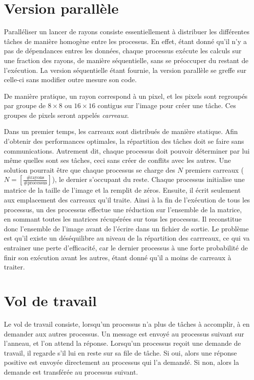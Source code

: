 \documentclass[a4paper,11pt]{article}
\begin{document}
\section{Version parallèle}

Paralléliser un lancer de rayons consiste essentiellement à distribuer les différentes tâches de manière homogène entre les processus. En effet, étant donné qu'il n'y  a pas de dépendances entres les données, chaque processus exécute les calculs sur une fraction des rayons, de manière séquentielle, sans se préoccuper du restant de l'exécution. La version séquentielle étant fournie, la version parallèle se greffe sur celle-ci sans modifier outre mesure son code.

De manière pratique, un rayon correspond à un pixel, et les pixels sont regroupés par groupe de $8 \times 8$ ou $16 \times 16$ contigus sur l'image pour créer une tâche. Ces groupes de pixels seront appelés \emph{carreaux}. 

Dans un premier temps, les carreaux sont distribués de manière statique. Afin d'obtenir des performances optimales, la répartition des tâches doit se faire sans communications. Autrement dit, chaque processus doit pouvoir déterminer par lui même quelles sont ses tâches, ceci sans créer de conflits avec les autres. Une solution pourrait être que chaque processus se charge des $N$ premiers carreaux ($N = \left[\frac{\#\mathrm{rayons}}{\#\mathrm{processus}}\right]$), le dernier s'occupant du reste. Chaque processus initialise une matrice de la taille de l'image et la remplit de zéros. Ensuite, il écrit seulement aux emplacement des carreaux qu'il traite. Ainsi à la fin de l'exécution de tous les processus, un des processus effectue une réduction sur l'ensemble de la matrice, en sommant toutes les matrices récupérées sur tous les processus. Il reconstitue donc l'ensemble de l'image avant de l'écrire dans un fichier de sortie.
Le problème est qu'il existe un déséquilibre au niveau de la répartition des carrreaux, ce qui va entrainer une perte d'efficacité, car le dernier processus à une forte probabilité de finir son exécution avant les autres, étant donné qu'il a moins de carreaux à traiter. 




\section{Vol de travail}

Le vol de travail consiste, lorsqu'un processus n'a plus de tâches à accomplir, à en demander aux autres processus. Un message est envoyé au processus suivant sur l'anneau, et l'on attend la réponse. Lorsqu'un processus reçoit une demande de travail, il regarde s'il lui en reste sur sa file de tâche. Si oui, alors une réponse positive est envoyée directement au processus qui l'a demandé. Si non, alors la demande est transférée au processus suivant.
\end{document}
